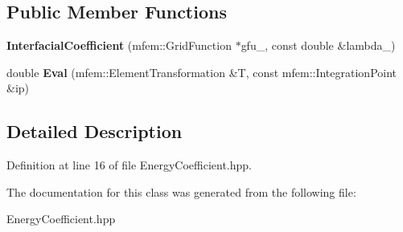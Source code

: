 \subsection*{Public Member Functions}
\begin{DoxyCompactItemize}
\item 
\mbox{\label{classInterfacialCoefficient_a97a4e4c020492eb889fd150aef6f4484}} 
{\bfseries Interfacial\+Coefficient} (mfem\+::\+Grid\+Function $\ast$gfu\+\_\+, const double \&lambda\+\_\+)
\item 
\mbox{\label{classInterfacialCoefficient_a129723114096b83dd145c6bea5ca83a4}} 
double {\bfseries Eval} (mfem\+::\+Element\+Transformation \&T, const mfem\+::\+Integration\+Point \&ip)
\end{DoxyCompactItemize}


\subsection{Detailed Description}


Definition at line 16 of file Energy\+Coefficient.\+hpp.



The documentation for this class was generated from the following file\+:\begin{DoxyCompactItemize}
\item 
Energy\+Coefficient.\+hpp\end{DoxyCompactItemize}
